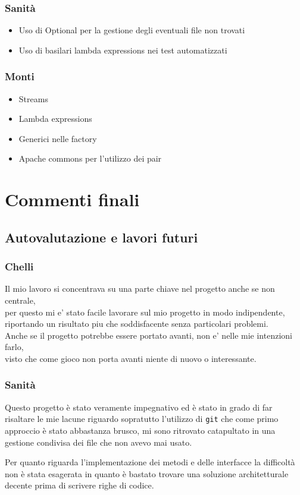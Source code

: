 \documentclass[a4paper,12pt]{report}
\begin{document}
    \subsection{Sanità}
    \begin{itemize}
            \item Uso di Optional per la gestione degli eventuali file non trovati
            \item Uso di basilari lambda expressions nei test automatizzati
    \end{itemize}
    \subsection{Monti}
    \begin{itemize}
        \item Streams
        \item Lambda expressions
        \item Generici nelle factory
        \item Apache commons per l'utilizzo dei pair
    \end{itemize}
    \chapter{Commenti finali}
    \section{Autovalutazione e lavori futuri}
    \subsection{Chelli}
    Il mio lavoro si concentrava su una parte chiave nel progetto anche se non centrale,\\
    per questo mi e' stato facile lavorare sul mio progetto in modo indipendente,\\
    riportando un risultato piu che soddisfacente senza particolari problemi.\\
    Anche se il progetto potrebbe essere portato avanti, non e' nelle mie intenzioni farlo,\\
    visto che come gioco non porta avanti niente di nuovo o interessante.\\
    \subsection{Sanità}
    \par Questo progetto è stato veramente impegnativo ed è stato in grado di far risaltare le mie lacune riguardo sopratutto l'utilizzo di \texttt{git} che come
    primo approccio è stato abbastanza brusco, mi sono ritrovato catapultato in una gestione condivisa dei file che non avevo mai usato.
    \par Per quanto riguarda l'implementazione dei metodi e delle interfacce la difficoltà non è stata esagerata in quanto è bastato trovare una soluzione
    architetturale decente prima di scrivere righe di codice.
\end{document}
